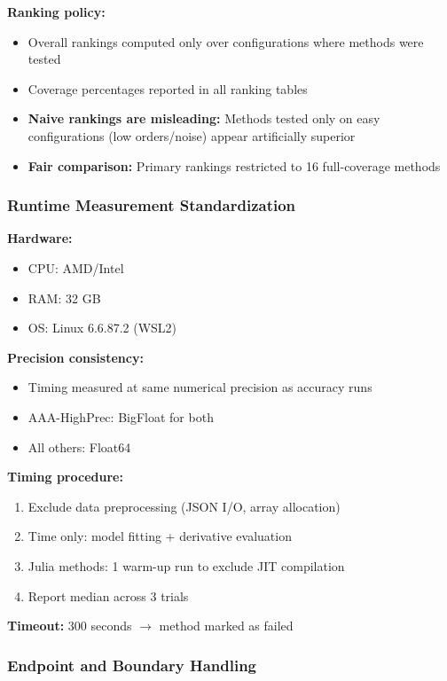 \textbf{Ranking policy:}
\begin{itemize}
    \item Overall rankings computed only over configurations where methods were tested
    \item Coverage percentages reported in all ranking tables
    \item \textbf{Naive rankings are misleading:} Methods tested only on easy configurations (low orders/noise) appear artificially superior
    \item \textbf{Fair comparison:} Primary rankings restricted to 16 full-coverage methods
\end{itemize}

\subsubsection{Runtime Measurement Standardization}

\textbf{Hardware:} 
\begin{itemize}
    \item CPU: AMD/Intel 
    \item RAM: 32 GB
    \item OS: Linux 6.6.87.2 (WSL2)
\end{itemize}

\textbf{Precision consistency:}
\begin{itemize}
    \item Timing measured at same numerical precision as accuracy runs
    \item AAA-HighPrec: BigFloat for both
    \item All others: Float64
\end{itemize}

\textbf{Timing procedure:}
\begin{enumerate}
    \item Exclude data preprocessing (JSON I/O, array allocation)
    \item Time only: model fitting + derivative evaluation
    \item Julia methods: 1 warm-up run to exclude JIT compilation
    \item Report median across 3 trials
\end{enumerate}

\textbf{Timeout:} 300 seconds $\rightarrow$ method marked as failed

\subsubsection{Endpoint and Boundary Handling}

